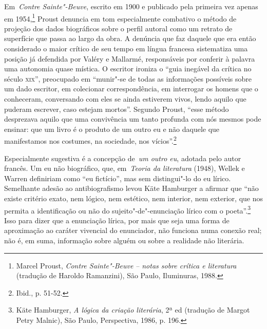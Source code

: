 Em~\emph{Contre Sainte"-Beuve}, escrito em 1900 e publicado pela primeira
vez apenas em 1954,\footnote{Marcel Proust, \emph{Contre Sainte"-Beuve}
  \emph{-- notas sobre crítica e literatura} (tradução de Haroldo
  Ramanzini), São Paulo, Iluminuras, 1988.} Proust denuncia em tom
especialmente combativo o método de projeção dos dados biográficos sobre
o perfil autoral como um retrato de superfície que passa ao largo da
obra. A denúncia que faz daquele que era então considerado o maior
crítico de seu tempo em língua francesa sistematiza uma posição já
defendida por Valéry e Mallarmé, responsáveis por conferir à palavra uma
autonomia quase mística. O escritor ironiza o ``guia inegável da crítica
no século \textsc{xix}'', preocupado em ``munir"-se de todas as
informações possíveis sobre um dado escritor, em colecionar
correspondência, em interrogar os homens que o conheceram, conversando
com eles se ainda estiverem vivos, lendo aquilo que puderam escrever,
caso estejam mortos''. Segundo Proust, ``esse método desprezava aquilo
que uma convivência um tanto profunda com nós mesmos pode ensinar: que
um livro é o produto de um outro eu e não daquele que manifestamos nos
costumes, na sociedade, nos vícios''.\footnote{Ibid., p. 51-52.}

Especialmente sugestiva é a concepção de~\emph{um outro eu}, adotada
pelo autor francês. Um eu não biográfico, que, em~\emph{Teoria da
literatura} (1948), Wellek e Warren definiriam como ``eu fictício'', mas
sem distingui"-lo do eu lírico. Semelhante adesão ao antibiografismo
levou Käte Hamburger a afirmar que ``não existe critério exato, nem
lógico, nem estético, nem interior, nem exterior, que nos permita a
identificação ou não do sujeito"-de"-enunciação lírico com o
poeta''.\footnote{Käte Hamburger, \emph{A lógica da criação literária},
  2ª ed (tradução de Margot Petry Malnic), São Paulo, Perspectiva, 1986,
  p. 196.} Isso para dizer que a enunciação lírica, por mais que seja
uma forma de aproximação ao caráter vivencial do enunciador, não
funciona numa conexão real; não é, em suma, informação sobre alguém ou
sobre a realidade não literária.

